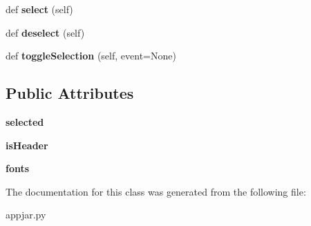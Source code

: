 \begin{DoxyCompactItemize}
\item 
\mbox{\label{class_python_01_g_u_i_1_1appjar_1_1_grid_cell_aaaf34fe7302d47cf08cde5bbccba916d}} 
def {\bfseries select} (self)
\item 
\mbox{\label{class_python_01_g_u_i_1_1appjar_1_1_grid_cell_a08692fd7daa49a101f7e8bbe1505daa7}} 
def {\bfseries deselect} (self)
\item 
\mbox{\label{class_python_01_g_u_i_1_1appjar_1_1_grid_cell_a57a4844bb4c6589e21a30ea396f23c60}} 
def {\bfseries toggle\+Selection} (self, event=None)
\end{DoxyCompactItemize}
\subsection*{Public Attributes}
\begin{DoxyCompactItemize}
\item 
\mbox{\label{class_python_01_g_u_i_1_1appjar_1_1_grid_cell_a73c42229b4ae259f65571e308fb70b3e}} 
{\bfseries selected}
\item 
\mbox{\label{class_python_01_g_u_i_1_1appjar_1_1_grid_cell_a05e7a368461a6a16627126558c30aaa8}} 
{\bfseries is\+Header}
\item 
\mbox{\label{class_python_01_g_u_i_1_1appjar_1_1_grid_cell_a77d112adaac71bf04c171d3efa0dfa5c}} 
{\bfseries fonts}
\end{DoxyCompactItemize}


The documentation for this class was generated from the following file\+:\begin{DoxyCompactItemize}
\item 
appjar.\+py\end{DoxyCompactItemize}
